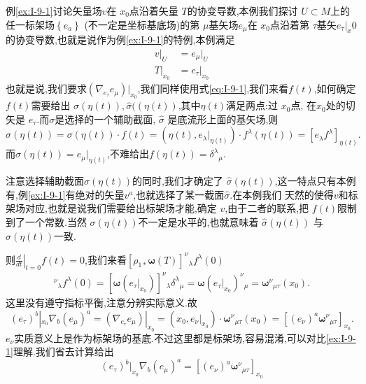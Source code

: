 \documentclass[../main.tex]{subfiles}
\begin{document}
\begin{example}
  \label{ex:I-9-2}
  例\ref{ex:I-9-1}讨论矢量场$v$在 $x_0$点沿着矢量 $T$的协变导数,本例我们探讨 $U \subset M$上的任一标架场$\left\{ e_a \right\} $ (不一定是坐标基底场)的第 $\mu$基矢场$e_\mu$在
  $x_0$点沿着第 $\tau$基矢$e_{\tau}|_x{0}$的协变导数,也就是说作为例\ref{ex:I-9-1}的特例,本例满足
  \begin{align*}
    v|_U &= e_\mu|_U\\
  T|_{x_0} &= e_\tau|_{x_0}
  \end{align*}
  也就是说,我们要求$(\nabla_{e_\tau} e_\mu)|_{x_0}$,我们同样使用式\ref{eq:I-9-1},我们来看$f(t)$,如何确定$f(t)$需要给出 $\sigma(\eta(t)),\hat{\sigma}((\eta(t))$,其中$\eta(t)$满足两点:过 $x_0$点, 在$x_0$处的切矢是 $e_\tau$.而$\sigma$是选择的一个辅助截面, $\hat{\sigma}$ 是底流形上面的基矢场,则 \[
    \hat{\sigma}(\eta(t)) = \sigma(\eta(t)) \cdot  f(t) = (\eta(t), e_\lambda|_{\eta(t)}) \cdot f^\lambda(\eta(t))  = [e_\lambda f^\lambda]_{\eta(t)}
  .\] 
  而$\hat{\sigma}(\eta(t)) = e_\mu|_{\eta(t)}$,不难给出$f(\eta(t)) = \delta^{\lambda}{}_{\mu}$.
  \begin{note}
    注意选择辅助截面$\sigma(\eta(t))$的同时,我们才确定了 $\hat{\sigma}(\eta(t))$,这一特点只有本例有,例\ref{ex:I-9-1}有绝对的矢量$v^a$,也就选择了某一截面$\hat{\sigma}$.在本例我们
    天然的使得$v$和标架场对应,也就是说我们需要给出标架场才能,确定 $v$,由于二者的联系,把 $f(t)$限制到了一个常数.当然 $\sigma(\eta(t))$不一定是水平的,也就意味着 $\hat{\sigma}(\eta(t))$ 与$\sigma(\eta(t))$一致.
  \end{note}
  则$\left.\frac{d}{dt}\right|_{t = 0} f(t) = 0 $,我们来看$[\rho_{1*} \bm{\omega}(T)]^{\nu}{}_{\lambda}f^{\lambda}(0) $ 
    \begin{align*}
      [\rho_{1*} \bm{\omega}(T)]^{\nu}{}_{\lambda}f^{\lambda}(0) = [\bm{\omega}(e_\tau|_{x_0}) ]^{\nu}{}_{\lambda} \delta^{\lambda}{}_{\mu}  =  \bm{\omega}(e_{\tau}|_{x_0}) ^{\nu}{}_{\mu} = \bm{\omega}^{\nu}{}_{\mu\tau}(x_0)  
    .\end{align*}
    这里没有遵守指标平衡,注意分辨实际意义.故\[
      (e_\tau)^b|_{x_0} \nabla _b (e_\mu)^a = (\nabla_{e_\tau} e_\mu)|_{x_0} = (x_0,e_\nu|_{x_0})\cdot \bm{\omega}^{\nu}{}_{\mu\tau}(x_0) = [(e_\nu)^a \bm{\omega}^{\nu}{}_{\mu \tau}]_{x_0}  
    .\] 
    $e_\nu$实质意义上是作为标架场的基底.不过这里都是标架场,容易混淆,可以对比\ref{ex:I-9-1}理解.我们省去计算给出
    \begin{equation}
      \label{eq:I-9-2}
      (e_\tau)^b|_{x_0} \nabla _b (e_\mu)^a =[(e_\nu)^a \bm{\omega}^{\nu}{}_{\mu \tau}]_{x_0}
    \end{equation}
  \end{example}
\end{document}
